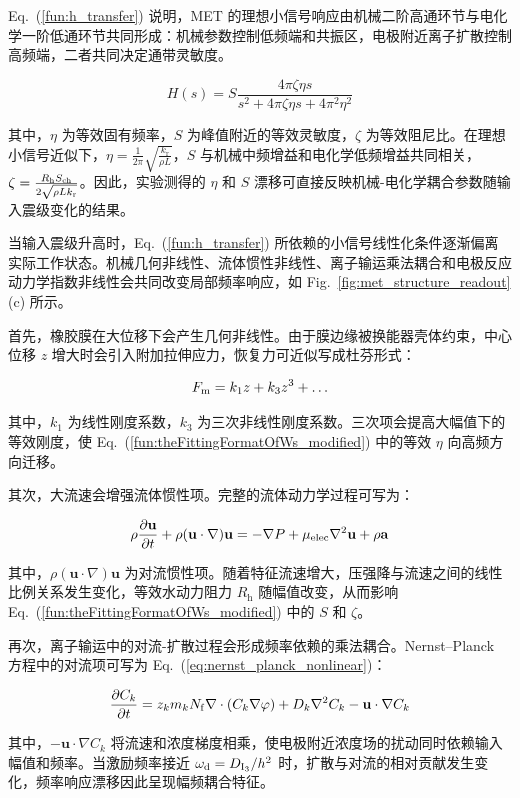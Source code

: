 \documentclass[sn-nature]{sn-jnl}
\newif\ifCNENEnglish
\newif\ifCNENBilingual
\newcommand{\CNEN}[2]{%
    \ifCNENBilingual
        #1%
        \if\relax\detokenize{#2}\relax\else\par #2\fi%
    \else
        \ifCNENEnglish
            #2%
        \else
            #1%
        \fi
    \fi
}
\newcommand{\fn}{\eta} %
\newcommand{\Sen}{S} %
\newcommand{\kr}{k_{\text{r}}} %
\begin{document}
\CNEN{Eq.~(\ref{fun:h_transfer}) 说明，MET 的理想小信号响应由机械二阶高通环节与电化学一阶低通环节共同形成：机械参数控制低频端和共振区，电极附近离子扩散控制高频端，二者共同决定通带灵敏度。}{}

\begin{equation}
    H(s) = \Sen \frac{4\pi \zeta \fn s}{s^2 + 4\pi \zeta \fn s + 4\pi^2 \fn^2}
    \label{fun:theFittingFormatOfWs_modified}
\end{equation}

\CNEN{其中，$\fn$ 为等效固有频率，$\Sen$ 为峰值附近的等效灵敏度，$\zeta$ 为等效阻尼比。在理想小信号近似下，$\fn = \frac{1}{2\pi} \sqrt{\frac{\kr}{\rho L}}$，$\Sen$ 与机械中频增益和电化学低频增益共同相关，$\zeta = \frac{R_{\text{h}} S_{\rm ch}}{2 \sqrt{\rho L \kr}}$。因此，实验测得的 $\fn$ 和 $\Sen$ 漂移可直接反映机械-电化学耦合参数随输入震级变化的结果。}{}

\CNEN{当输入震级升高时，Eq.~(\ref{fun:h_transfer}) 所依赖的小信号线性化条件逐渐偏离实际工作状态。机械几何非线性、流体惯性非线性、离子输运乘法耦合和电极反应动力学指数非线性会共同改变局部频率响应，如 Fig.~\ref{fig:met_structure_readout}(c) 所示。}{}

\CNEN{首先，橡胶膜在大位移下会产生几何非线性。由于膜边缘被换能器壳体约束，中心位移 $z$ 增大时会引入附加拉伸应力，恢复力可近似写成杜芬形式：}{}
\begin{equation}
    F_{\rm m} = k_1 z + k_3 z^3 + \dots
    \label{eq:duffing_nonlinear}
\end{equation}
\CNEN{其中，$k_1$ 为线性刚度系数，$k_3$ 为三次非线性刚度系数。三次项会提高大幅值下的等效刚度，使 Eq.~(\ref{fun:theFittingFormatOfWs_modified}) 中的等效 $\fn$ 向高频方向迁移。}{}

\CNEN{其次，大流速会增强流体惯性项。完整的流体动力学过程可写为：}{}
\begin{equation}
    \rho \frac{\partial \mathbf{u}}{\partial t}
    + \rho(\mathbf{u}\cdot\nabla)\mathbf{u}
    = -\nabla P + \mu_{\rm elec}\nabla^2\mathbf{u} + \rho\mathbf{a}
    \label{eq:navier_stokes_full}
\end{equation}
\CNEN{其中，$\rho(\mathbf{u}\cdot\nabla)\mathbf{u}$ 为对流惯性项。随着特征流速增大，压强降与流速之间的线性比例关系发生变化，等效水动力阻力 $R_{\text{h}}$ 随幅值改变，从而影响 Eq.~(\ref{fun:theFittingFormatOfWs_modified}) 中的 $\Sen$ 和 $\zeta$。}{}

\CNEN{再次，离子输运中的对流-扩散过程会形成频率依赖的乘法耦合。Nernst--Planck 方程中的对流项可写为 Eq.~(\ref{eq:nernst_planck_nonlinear})：}{}
\begin{equation}
    \frac{\partial C_k}{\partial t} =
    z_k m_k N_{\rm f}\nabla\cdot(C_k\nabla\varphi)
    + D_k\nabla^2 C_k
    - \mathbf{u}\cdot\nabla C_k
    \label{eq:nernst_planck_nonlinear}
\end{equation}
\CNEN{其中，$-\mathbf{u}\cdot\nabla C_k$ 将流速和浓度梯度相乘，使电极附近浓度场的扰动同时依赖输入幅值和频率。当激励频率接近 $\omega_{\rm d}=D_{\mathrm{I}_3}/h^2$ 时，扩散与对流的相对贡献发生变化，频率响应漂移因此呈现幅频耦合特征。}{}
\end{document}
